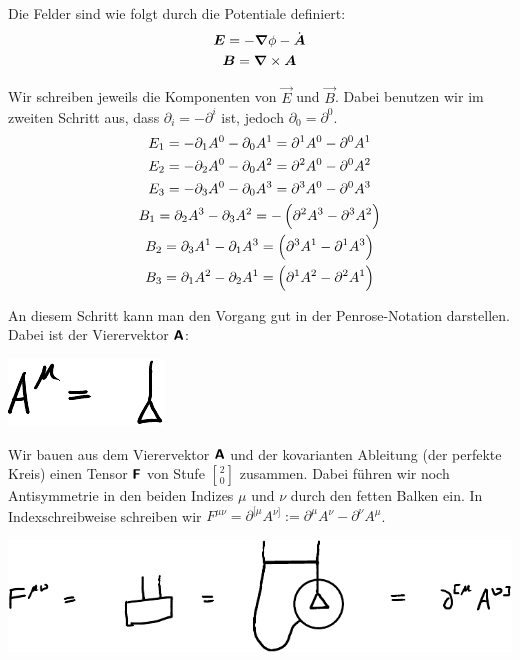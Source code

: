 Die Felder sind wie folgt durch die Potentiale definiert:
\begin{gather*}
	\boldsymbol{E} = - \boldsymbol{\nabla} \phi - \dot{\boldsymbol{A}} \\
	\boldsymbol{B} = \boldsymbol{\nabla} \times \boldsymbol{A}
\end{gather*}

Wir schreiben jeweils die Komponenten von $\vec E$ und $\vec B$. Dabei benutzen
wir im zweiten Schritt aus, dass $\partial_i = - \partial^i$ ist, jedoch
$\partial_0 = \partial^0$.
\begin{gather*}
	E_1
	= - \partial_1 A^0 - \partial_0 A^1
	= \partial^1 A^0 - \partial^0 A^1
	\\
	E_2
	= - \partial_2 A^0 - \partial_0 A^2
	= \partial^2 A^0 - \partial^0 A^2
	\\
	E_3
	= - \partial_3 A^0 - \partial_0 A^3
	= \partial^3 A^0 - \partial^0 A^3
	\\
	B_1
	= \partial_2 A^3 - \partial_3 A^2
	= -\del{\partial^2 A^3 - \partial^3 A^2}
	\\
	B_2
	= \partial_3 A^1 - \partial_1 A^3
	= \del{\partial^3 A^1 - \partial^1 A^3}
	\\
	B_3
	= \partial_1 A^2 - \partial_2 A^1
	= \del{\partial^1 A^2 - \partial^2 A^1}
	\\
\end{gather*}

An diesem Schritt kann man den Vorgang gut in der Penrose-Notation
\cite{penrose-road_to_reality} darstellen.  Dabei ist der Vierervektor $\boldsymbol{\mathsf{A}}$:
\begin{center}
	\includegraphics{H1-Penrose-2-crop.pdf}
\end{center}

Wir bauen aus dem Vierervektor $\boldsymbol{\mathsf{A}}$ und der kovarianten Ableitung (der
perfekte Kreis) einen Tensor $\boldsymbol{\mathsf{F}}$ von Stufe ${2 \brack 0}$ zusammen. Dabei
führen wir noch Antisymmetrie in den beiden Indizes $\mu$ und $\nu$ durch den
fetten Balken ein. In Indexschreibweise schreiben wir $F^{\mu\nu} =
\partial^{[\mu} A^{\nu]} := \partial^\mu A^\nu - \partial^\nu A^\mu$.
\begin{center}
	\includegraphics{H1-Penrose-1-crop.pdf}
\end{center}

